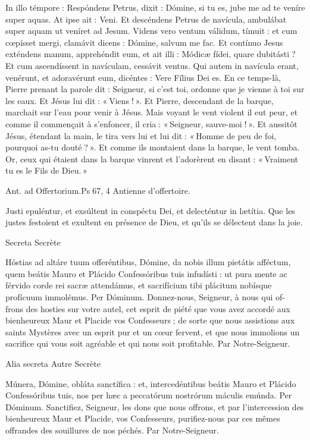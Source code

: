 \begin{paracol}{2}
In illo témpore : Respóndens Petrus, dixit : Dómine, si tu es, jube me ad te veníre super aquas. At ipse ait : Veni. Et descéndens Petrus de navícula, ambulábat super aquam ut veníret ad Jesum. Videns vero ventum válidum, tímuit : et cum cœpísset mergi, clamávit dicens : Dómine, salvum me fac. Et contínuo Jesus exténdens manum, apprehéndit eum, et ait illi : Módicæ fídei, quare dubitásti ? Et cum ascendíssent in navículam, cessávit ventus. Qui autem in navícula erant, venérunt, et adoravérunt eum, dicéntes : Vere Fílius Dei es.
\switchcolumn
En ce temps-là, Pierre prenant la parole dit : Seigneur, si c’est toi, ordonne que je vienne à toi sur les eaux. Et Jésus lui dit : « Viens ! ». Et Pierre, descendant de la barque, marchait sur l’eau pour venir à Jésus. Mais voyant le vent violent il eut peur, et comme il commençait à s’enfoncer, il cria : « Seigneur, sauve-moi ! ». Et aussitôt Jésus, étendant la main, le tira vers lui et lui dit : « Homme de peu de foi, pourquoi as-tu douté ? ». Et comme ils montaient dans la barque, le vent tomba. Or, ceux qui étaient dans la barque vinrent et l’adorèrent en disant : « Vraiment tu es le Fils de Dieu. »
\switchcolumn*

Ant. ad Offertorium.\hfill Ps 67, 4
\switchcolumn
Antienne d’offertoire.
\switchcolumn*

Justi epuléntur, et exsúltent in conspéctu Dei, et delecténtur in lætítia.
\switchcolumn
Que les justes festoient et exultent en présence de Dieu, et qu’ils se délectent dans la joie.
\switchcolumn*

Secreta
\switchcolumn
Secrète
\switchcolumn*

Hóstias ad altáre tuum offeréntibus,  Dómine, da nobis illum pietátis afféctum, quem beátis Mauro et Plácido Confessóribus tuis infudísti : ut pura mente ac férvido corde rei sacræ attendámus, et sacrifícium tibi plácitum nobísque profícuum immolémus. Per Dóminum.
\switchcolumn
Donnez-nous, Seigneur, à nous qui of- frons des hosties sur votre autel, cet esprit de piété que vous avez accordé aux bienheureux Maur et Placide vos Confesseurs ; de sorte que nous assistions aux saints Mystères avec un esprit pur et un cœur fervent, et que nous immolions un sacrifice qui vous soit agréable et qui nous soit profitable. Par Notre-Seigneur.
\switchcolumn*

Alia secreta
\switchcolumn
Autre Secrète
\switchcolumn*

Múnera, Dómine, obláta sanctífica :  et, intercedéntibus beátis Mauro et Plácido Confessóribus tuis, nos per hæc a peccatórum nostrórum máculis emúnda. Per Dóminum.
\switchcolumn
Sanctifiez, Seigneur, les dons que nous  offrons, et par l’intercession des bienheureux Maur et Placide, vos Confesseurs, purifiez-nous par ces mêmes offrandes des souillures de nos péchés. Par Notre-Seigneur.
\switchcolumn*


\end{paracol}
